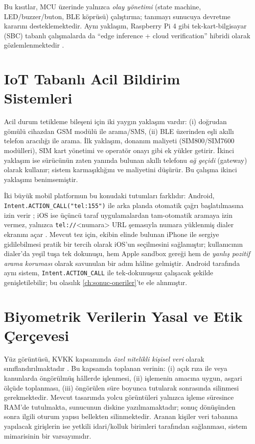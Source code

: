 Bu kısıtlar, MCU üzerinde yalnızca \emph{olay yönetimi} (state machine,
LED/buzzer/buton, BLE köprüsü) çalıştırma; tanımayı sunucuya devretme
kararını desteklemektedir. Aynı yaklaşım, Raspberry Pi 4 gibi
tek-kart-bilgisayar (SBC) tabanlı çalışmalarda da
``edge inference + cloud verification'' hibridi olarak
gözlemlenmektedir \cite{kumar2021edgeface}.

\section{IoT Tabanlı Acil Bildirim Sistemleri}

Acil durum tetikleme bileşeni için iki yaygın yaklaşım vardır:
(i) doğrudan gömülü cihazdan GSM modülü ile arama/SMS, (ii) BLE üzerinden
eşli akıllı telefon aracılığı ile arama. İlk yaklaşım, donanım maliyeti
(SIM800/SIM7600 modülleri), SIM kart yönetimi ve operatör onayı gibi ek
yükler getirir. İkinci yaklaşım ise sürücünün zaten yanında bulunan akıllı
telefonu \emph{ağ geçidi} (gateway) olarak kullanır; sistem karmaşıklığını
ve maliyetini düşürür. Bu çalışma ikinci yaklaşımı benimsemiştir.

İki büyük mobil platformun bu konudaki tutumları farklıdır: Android,
\texttt{Intent.ACTION\_CALL("tel:155")} ile arka planda otomatik çağrı
başlatılmasına izin verir \cite{android2024telephony}; iOS ise üçüncü
taraf uygulamalardan tam-otomatik aramaya izin vermez, yalnızca
\texttt{tel://}<numara> URL şemasıyla numara yüklenmiş dialer ekranını
açar \cite{apple_tel_url}. Mevcut tez için, ekibin elinde bulunan iPhone
ile sergiye gidilebilmesi pratik bir tercih olarak iOS'un seçilmesini
sağlamıştır; kullanıcının dialer'da yeşil tuşa tek dokunuşu, hem Apple
sandbox gereği hem de \emph{yanlış pozitif arama koruması} olarak
savunulan bir adım hâline gelmiştir. Android tarafında aynı sistem,
\texttt{Intent.ACTION\_CALL} ile tek-dokunuşsuz çalışacak şekilde
genişletilebilir; bu olasılık \ref{ch:sonuc-oneriler}'te ele alınmıştır.

\section{Biyometrik Verilerin Yasal ve Etik Çerçevesi}

Yüz görüntüsü, KVKK kapsamında \emph{özel nitelikli kişisel veri} olarak
sınıflandırılmaktadır \cite{kvkk2016}. Bu kapsamda toplanan verinin:
(i) açık rıza ile veya kanunlarda öngörülmüş hâllerde işlenmesi,
(ii) işlemenin amacına uygun, asgari ölçüde toplanması,
(iii) öngörülen süre boyunca tutularak sonrasında silinmesi
gerekmektedir. Mevcut tasarımda yolcu görüntüleri yalnızca işleme süresince
RAM'de tutulmakta, sunucunun diskine yazılmamaktadır; sonuç dönüşünden
sonra ilgili oturum yapısı bellekten silinmektedir. Aranan kişiler veri
tabanına yapılacak girişlerin ise yetkili idari/kolluk birimleri
tarafından sağlanması, sistem mimarisinin bir varsayımıdır.


